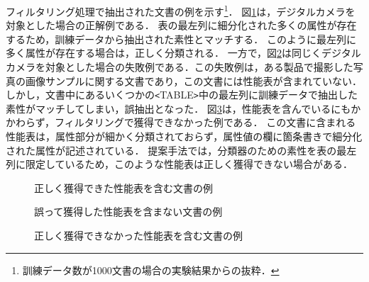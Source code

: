 フィルタリング処理で抽出された文書の例を示す\footnote{訓練データ数が1000文書の場合の実験結果からの抜粋．}．
図\ref{ok}は，デジタルカメラを対象とした場合の正解例である．
表の最左列に細分化された多くの属性が存在するため，訓練データから抽出された素性とマッチする．
このように最左列に多く属性が存在する場合は，正しく分類される．
一方で，図\ref{bad}は同じくデジタルカメラを対象とした場合の失敗例である．この失敗例は，ある製品で撮影した写真の画像サンプルに関する文書であり，この文書には性能表が含まれていない．しかし，文書中にあるいくつかの\verb+<+TABLE\verb+>+中の最左列に訓練データで抽出した素性がマッチしてしまい，誤抽出となった．
図\ref{miss}は，性能表を含んでいるにもかかわらず，フィルタリングで獲得できなかった例である．
この文書に含まれる性能表は，属性部分が細かく分類されておらず，属性値の欄に箇条書きで細分化された属性が記述されている．
提案手法では，分類器のための素性を表の最左列に限定しているため，このような性能表は正しく獲得できない場合がある．

\begin{figure}[!tb]
\begin{center}
\end{center}
\vspace{-3mm}
\caption{正しく獲得できた性能表を含む文書の例}
\label{ok}
\end{figure}

\begin{figure}[!tb]
\begin{center}
\end{center}
\vspace{-3mm}
\caption{誤って獲得した性能表を含まない文書の例}
\label{bad}
\end{figure}

\begin{figure}[!tb]
\begin{center}
\end{center}
\vspace{-3mm}
\caption{正しく獲得できなかった性能表を含む文書の例}
\label{miss}
\end{figure}


